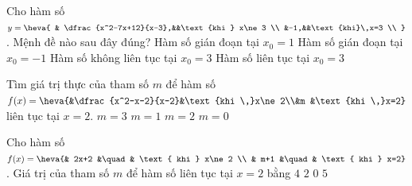 \begin{ex}%
	 Cho hàm số $y=\heva{
	& \dfrac{x^2-7x+12}{x-3},&&\text{khi } x\ne 3  \\
	&-1,&&\text{khi}\,x=3  \\
	}$. Mệnh đề nào sau đây đúng? 
	 \choice
		{Hàm số gián đoạn  tại $x_0=1$}
		{Hàm số gián đoạn tại $x_0=-1$} 
		{Hàm số  không liên tục tại $x_0=3$}
		{\True Hàm số liên tục tại $x_0=3$} 
\end{ex}

\begin{ex}%
	Tìm giá trị thực của tham số $m$ để hàm số $f(x)=\heva{&\dfrac{x^2-x-2}{x-2}&\text{khi \,}x\ne 2\\&m &\text{khi \,}x=2}$ liên tục  tại $x=2$.
	\choice 
		{\True  $m=3$}
		 {$m=1$}
		{$m=2$} 
		 {$m=0$}
\end{ex}

\begin{ex}%
	Cho hàm số $f(x)=\heva{& 2x+2 &\quad& \text{ khi }  x\ne 2 \\ & m+1 &\quad& \text{ khi } x=2}$. Giá trị của tham số $m$ để hàm số liên tục tại $x=2$ bằng
	 \choice
		{$4$} 
		{$2$} 
		{$0$} 
		{\True $5$} 
\end{ex}

